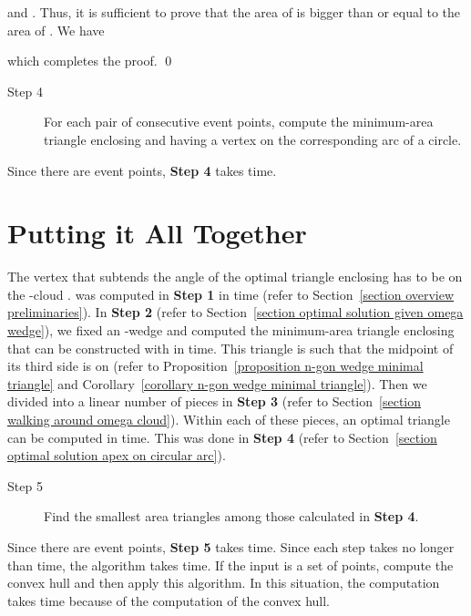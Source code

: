 \documentclass[11pt, oneside]{article}
\begin{document}
and .
Thus,
it is sufficient to prove that the area of 
is bigger than or equal to the area of .
We have

which completes the proof.
\qed


\begin{description}
\item[Step 4] For each pair of consecutive event points,
compute the minimum-area triangle enclosing 
and having a vertex on the corresponding arc of a circle.
\end{description}

Since there are  event points,
{\bf Step 4} takes  time.




\section{Putting it All Together}
\label{section putting all together}




The vertex that subtends the angle  
of the optimal triangle enclosing 
has to be on the -cloud .
 was computed in {\bf Step 1}
in  time
(refer to Section~\ref{section overview preliminaries}).
In {\bf Step 2}
(refer to Section~\ref{section optimal solution given omega wedge}),
we fixed an -wedge 
and computed the minimum-area triangle enclosing 
that can be constructed with 
in  time.
This triangle is such that
the midpoint  of its third side is on 
(refer to Proposition~\ref{proposition n-gon wedge minimal triangle} 
and Corollary~\ref{corollary n-gon wedge minimal triangle}).
Then we divided  into a linear number of pieces
in {\bf Step 3}
(refer to Section~\ref{section walking around omega cloud}).
Within each of these pieces,
an optimal triangle can be computed in  time.
This was done in {\bf Step 4}
(refer to Section~\ref{section optimal solution apex on circular arc}).

\begin{description}
\item[Step 5] Find the smallest area triangles among those calculated 
in {\bf Step 4}.
\end{description}

Since there are  event points,
{\bf Step 5} takes  time.
Since each step takes no longer than  time,
the algorithm takes  time.
If the input is a set of points,
compute the convex hull
and then apply this algorithm.
In this situation,
the computation takes  time
because of the computation of the convex hull.
\end{document}
